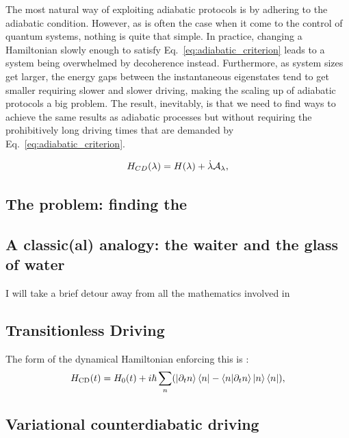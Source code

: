     The most natural way of exploiting adiabatic protocols is by adhering to the adiabatic condition. However, as is often the case when it come to the control of quantum systems, nothing is quite that simple. In practice, changing a Hamiltonian slowly enough to satisfy Eq.~\eqref{eq:adiabatic_criterion} leads to a system being overwhelmed by decoherence instead. Furthermore, as system sizes get larger, the energy gaps between the instantaneous eigenstates tend to get smaller  requiring slower and slower driving, making the scaling up of adiabatic protocols a big problem. The result, inevitably, is that we need to find ways to achieve the same results as adiabatic processes but without requiring the prohibitively long driving times that are demanded by Eq.~\eqref{eq:adiabatic_criterion}.
    
    

    \begin{equation}\label{eq:CD_Hamiltonian}
    H_{CD}(\lambda) = H(\lambda) + \dot{\lambda} \mathcal{A}_\lambda,
    \end{equation}

    \subsection{The problem: finding the }

    \subsection{A classic(al) analogy: the waiter and the glass of water}

    I will take a brief detour away from all the mathematics involved in 
    
    \subsection{Transitionless Driving}
    The form of the dynamical Hamiltonian enforcing this is \cite{berry_transitionless_2009}:
    \begin{equation}\label{eq:counterdiabatic}
        H_{\mathrm{CD}}(t) = H_0 (t) + i\hbar \sum_n (\ket{\partial_t n}\bra{n} - \bra{n}\ket{\partial_t n}\ket{n}\bra{n}),
    \end{equation}
    \subsection{Variational counterdiabatic driving}

